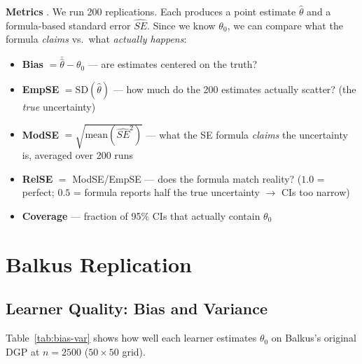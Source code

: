 \documentclass[11pt,a4paper]{article}
\begin{document}
\textbf{Metrics} \citep{morris2019}. We run 200 replications. Each produces a point estimate $\hat\theta$ and a formula-based standard error $\widehat{SE}$. Since we know $\theta_0$, we can compare what the formula \emph{claims} vs.\ what \emph{actually happens}:
\begin{itemize}[leftmargin=1.5em, nosep]
  \item \textbf{Bias} $= \bar{\hat\theta} - \theta_0$ --- are estimates centered on the truth?
  \item \textbf{EmpSE} $= \text{SD}(\hat\theta)$ --- how much do the 200 estimates actually scatter? (the \emph{true} uncertainty)
  \item \textbf{ModSE} $= \sqrt{\text{mean}(\widehat{SE}^2)}$ --- what the SE formula \emph{claims} the uncertainty is, averaged over 200 runs
  \item \textbf{RelSE} $=$ ModSE/EmpSE --- does the formula match reality? ($1.0$ = perfect; $0.5$ = formula reports half the true uncertainty $\to$ CIs too narrow)
  \item \textbf{Coverage} --- fraction of 95\% CIs that actually contain $\theta_0$
\end{itemize}


\section{Balkus Replication}
\label{sec:balkus}

\subsection{Learner Quality: Bias and Variance}

Table~\ref{tab:bias-var} shows how well each learner estimates $\theta_0$ on Balkus's original DGP at $n = 2500$ ($50 \times 50$ grid).
\end{document}
